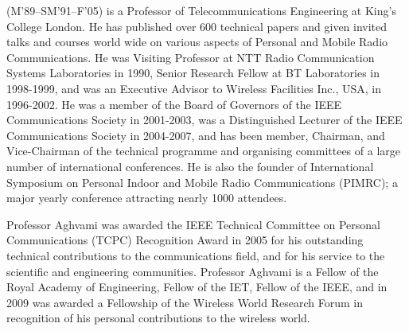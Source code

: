 \documentclass[journal]{IEEEtran}
\renewenvironment{IEEEbiography}[1]
  {\IEEEbiographynophoto{#1}}
  {\endIEEEbiographynophoto}
\begin{document}
\begin{IEEEbiography}{Abdol-Hamid Aghvami}
(M'89--SM'91--F'05) is a Professor of Telecommunications Engineering at King's College London. He has published over 600 technical papers and given invited talks and courses world wide on various aspects of Personal and Mobile Radio Communications. He was Visiting Professor at NTT Radio Communication Systems Laboratories in 1990, Senior Research Fellow at BT Laboratories in 1998-1999, and was an Executive Advisor to Wireless Facilities Inc., USA, in 1996-2002. He was a member of the Board of Governors of the IEEE Communications Society in 2001-2003, was a Distinguished Lecturer of the IEEE Communications Society in 2004-2007, and has been member, Chairman, and Vice-Chairman of the technical programme and organising committees of a large number of international conferences. He is also the founder of International Symposium on Personal Indoor and Mobile Radio Communications (PIMRC); a major yearly conference attracting nearly 1000 attendees.

Professor Aghvami was awarded the IEEE Technical Committee on Personal Communications
(TCPC) Recognition Award in 2005 for his outstanding technical contributions to the
communications field, and for his service to the scientific and engineering communities.
Professor Aghvami is a Fellow of the Royal Academy of Engineering, Fellow of the IET,
Fellow of the IEEE, and in 2009 was awarded a Fellowship of the Wireless World Research
Forum in recognition of his personal contributions to the wireless world. 
\end{IEEEbiography}
\end{document}
